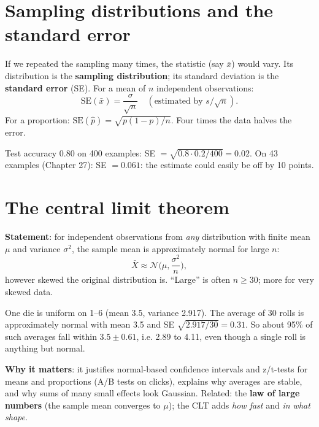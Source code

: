 \section{Sampling distributions and the standard error}
If we repeated the sampling many times, the statistic (say $\bar x$) would vary. Its distribution is the \textbf{sampling distribution}; its standard deviation is the
\textbf{standard error} (SE). For a mean of $n$ independent observations:
\[ \text{SE}(\bar x) = \frac{\sigma}{\sqrt n}\quad(\text{estimated by } s/\sqrt n). \]
For a proportion: $\text{SE}(\hat p) = \sqrt{p(1-p)/n}$. Four times the data halves the error.
\begin{example}
Test accuracy 0.80 on 400 examples: SE $= \sqrt{0.8\cdot0.2/400} = 0.02$. On 43 examples (Chapter 27): SE $= 0.061$: the estimate could easily be off by 10 points.
\end{example}

\section{The central limit theorem}
\textbf{Statement}: for independent observations from \emph{any} distribution with finite mean $\mu$ and variance $\sigma^2$, the sample mean is approximately normal for large $n$:
\[ \bar X\approx\mathcal N\Big(\mu,\frac{\sigma^2}{n}\Big), \]
however skewed the original distribution is. ``Large'' is often $n\ge30$; more for very skewed data.
\begin{example}
One die is uniform on 1--6 (mean 3.5, variance 2.917). The average of 30 rolls is approximately normal with mean 3.5 and SE $\sqrt{2.917/30} = 0.31$. So about 95\% of such averages
fall within $3.5\pm0.61$, i.e. 2.89 to 4.11, even though a single roll is anything but normal.
\end{example}
\textbf{Why it matters}: it justifies normal-based confidence intervals and z/t-tests for means and proportions (A/B tests on clicks), explains why averages are stable,
and why sums of many small effects look Gaussian.
Related: the \textbf{law of large numbers} (the sample mean converges to $\mu$); the CLT adds \emph{how fast} and \emph{in what shape}.

